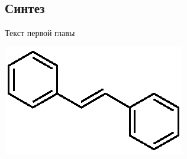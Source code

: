 		\subsection{Синтез}
		
			Текст первой главы
			
			\begin{scheme}
				\includegraphics{Dissertation/images/part1/Stilbene}
			\end{scheme}
			
			
			
			
			